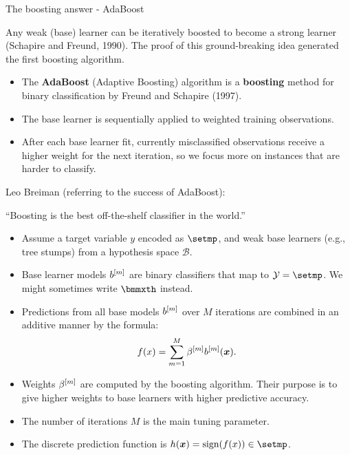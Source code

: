 

\begin{vbframe}{The boosting answer - AdaBoost}

Any weak (base) learner can be iteratively boosted to become
a strong learner (Schapire and Freund, 1990).
The proof of this ground-breaking idea generated the first boosting algorithm.

\begin{itemize}
  \item The \textbf{AdaBoost} (Adaptive Boosting) algorithm is a \textbf{boosting} method
    for binary classification by Freund and Schapire (1997).
  \item The base learner is sequentially applied to weighted training observations.
  \item After each base learner fit, currently misclassified observations receive a higher weight for
    the next iteration, so we focus more on instances that are harder to classify.
\end{itemize}

Leo Breiman (referring to the success of AdaBoost):

\enquote{Boosting is the best off-the-shelf classifier in the world.}

\framebreak

\begin{itemize}
  \item Assume a target variable $y$ encoded as $\setmp$,
    and weak base learners (e.g., tree stumps) from a hypothesis space $\mathcal{B}$.
  \item Base learner models $b^{[m]}$ are binary classifiers that map to $\Yspace = \setmp$.
    We might sometimes write $\bmmxth$ instead.
  \item Predictions from all base models $b^{[m]}$ over $M$ iterations are combined in an additive manner by the formula:
    $$
    f(x) = \sum_{m=1}^{M} \beta^{[m]} b^{[m]}(\bm{x}).
    $$
  \item Weights $\beta^{[m]}$ are computed by the boosting algorithm.
    Their purpose is to give higher weights to base learners with higher predictive accuracy.
  \item The number of iterations $M$ is the main tuning parameter.
  \item The discrete prediction function is $h(\xv) = \text{sign}(\fx) \in \setmp$.
\end{itemize}


\end{vbframe}

